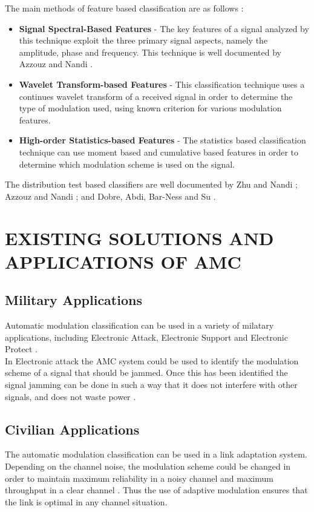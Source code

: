 \documentclass[10pt,twocolumn]{witseiepaper}
\begin{document}
	The main methods of feature based classification are as follows \cite{zhu2014automatic}: 
	\begin{itemize}
		\item \textbf{Signal Spectral-Based Features} - The key features of a signal analyzed by this technique exploit the three primary signal aspects, namely the amplitude, phase and frequency. This technique is well documented by Azzouz and Nandi \cite{azzouz2013automatic}.
		\item \textbf{Wavelet Transform-based Features} - This classification technique uses a continues wavelet transform of a received signal in order to determine the type of modulation used, using known criterion for various modulation features.
		\item \textbf{High-order Statistics-based Features} - The statistics based classification technique can use moment based and cumulative based features in order to determine which modulation scheme is used on the signal.
	\end{itemize}
	The distribution test based classifiers are well documented by Zhu and Nandi \cite{zhu2014automatic}; Azzouz and Nandi \cite{azzouz2013automatic}; and Dobre, Abdi, Bar-Ness and Su \cite{dobre2007survey}.

\section{EXISTING SOLUTIONS AND APPLICATIONS OF AMC}
	\subsection{Military Applications}
		Automatic modulation classification can be used in a variety of milatary applications, including Electronic Attack, Electronic Support and Electronic Protect \cite{zhu2014automatic}.\\[10pt]
		In Electronic attack the AMC system could be used to identify the modulation scheme of a signal that should be jammed. Once this has been identified the signal jamming can be done in such a way that it does not interfere with other signals, and does not waste power \cite{zhu2014automatic}.
	\subsection{Civilian Applications}
		The automatic modulation classification can be used in a link adaptation system. Depending on the channel noise, the modulation scheme could be changed in order to maintain maximum reliability in a noisy channel and maximum throughput in a clear channel \cite{zhu2014automatic}. Thus the use of adaptive modulation ensures that the link is optimal in any channel situation.
\end{document}
